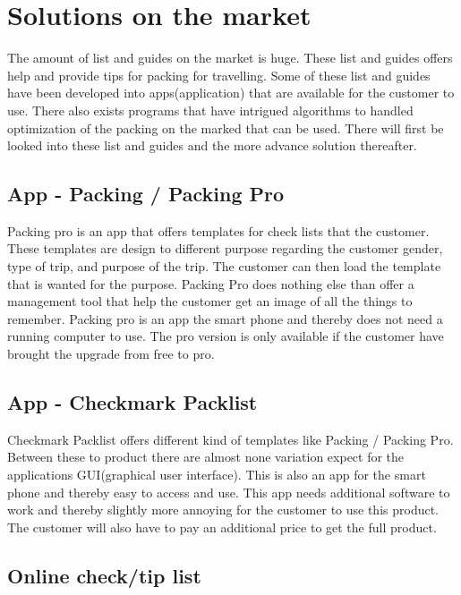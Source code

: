 \section{Solutions on the market}

The amount of list and guides on the market is huge. These list and guides offers help and provide tips for packing for travelling. Some of these list and guides have been developed into apps(application) that are available for the customer to use.
There also exists programs that have intrigued algorithms to handled optimization of the packing on the marked that can be used.
There will first be looked into these list and guides and the more advance solution thereafter.

\subsection{App - Packing / Packing Pro}

Packing pro is an app that offers templates for check lists that the customer. These templates are design to different purpose regarding the customer gender, type of trip, and purpose of the trip.
The customer can then load the template that is wanted for the purpose. Packing Pro does nothing else than offer a management tool that help the customer get an image of all the things to remember. Packing pro is an app the smart phone and thereby does not need a running computer to use. The pro version is only available if the customer have brought the upgrade from free to pro. %

\subsection{App - Checkmark Packlist}

Checkmark Packlist offers different kind of templates like Packing / Packing Pro. Between these to product there are almost none variation expect for the applications GUI(graphical user interface). This is also an app for the smart phone and thereby easy to access and use.
This app needs additional software to work and thereby slightly more annoying for the customer to use this product. The customer will also have to pay an additional price to get the full product. %

\subsection{Online check/tip list}

